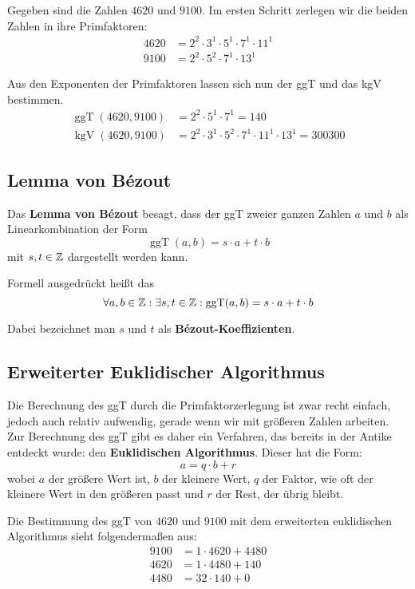 \documentclass[11pt]{article}
\begin{document}
\begin{bsp}
  Gegeben sind die Zahlen $4620$ und $9100$. Im ersten Schritt zerlegen wir die beiden Zahlen in ihre Primfaktoren:
  \begin{align*}
    4620 & = 2^2 \cdot 3^1 \cdot 5^1 \cdot 7^1 \cdot 11^1 \\
    9100 & = 2^2 \cdot 5^2 \cdot 7^1 \cdot 13^1
  \end{align*}

  Aus den Exponenten der Primfaktoren lassen sich nun der ggT und das kgV bestimmen.
  \begin{align*}
    \operatorname{ggT}(4620, 9100) & = 2^2 \cdot 5^1 \cdot 7^1 = 140                                    \\
    \operatorname{kgV}(4620, 9100) & = 2^2 \cdot 3^1 \cdot 5^2 \cdot 7^1 \cdot 11^1 \cdot 13^1 = 300300
  \end{align*}
\end{bsp}

\subsection{Lemma von Bézout}
Das \textbf{Lemma von Bézout} besagt, dass der ggT zweier ganzen Zahlen $a$ und $b$ als Linearkombination der Form
\[
  \operatorname{ggT}(a,b) = s \cdot a + t \cdot b
\]
mit $s, t \in \mathbb{Z}$ dargestellt werden kann.

Formell ausgedrückt heißt das
\[
  \forall a,b \in \mathbb{Z}: \exists s,t \in \mathbb{Z}: \operatorname{ggT}(a,b) = s \cdot a + t \cdot b
\]

Dabei bezeichnet man $s$ und $t$ als \textbf{Bézout-Koeffizienten}.

\subsection{Erweiterter Euklidischer Algorithmus}
Die Berechnung des ggT durch die Primfaktorzerlegung ist zwar recht einfach, jedoch auch relativ aufwendig, gerade wenn
wir mit größeren Zahlen arbeiten. Zur Berechnung des ggT gibt es daher ein Verfahren, das bereits in der Antike entdeckt
wurde: den \textbf{Euklidischen Algorithmus}. Dieser hat die Form:
\[
  a = q \cdot b + r
\]
wobei $a$ der größere Wert ist, $b$ der kleinere Wert, $q$ der Faktor, wie oft der kleinere Wert in den größeren passt und
$r$ der Rest, der übrig bleibt.

\begin{bsp}
  Die Bestimmung des ggT von $4620$ und $9100$ mit dem erweiterten euklidischen Algorithmus sieht folgendermaßen aus:
  \begin{align}
    9100 & = 1 \cdot 4620 + 4480 \\
    4620 & = 1 \cdot 4480 + 140  \\
    4480 & = 32 \cdot 140 + 0
  \end{align}
\end{bsp}
\end{document}
